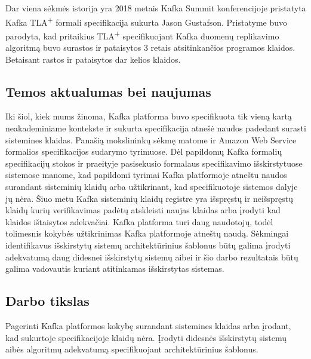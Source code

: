 \documentclass{VUMIFPSmagistrinis}
\begin{document}
		Dar viena sėkmės istorija yra 2018 metais Kafka Summit konferencijoje pristatyta Kafka TLA\textsuperscript{+} formali specifikacija sukurta Jason Gustafson\cite{kfkTla}.
		Pristatyme buvo parodyta, kad pritaikius TLA\textsuperscript{+} specifikuojant Kafka duomenų replikavimo algoritmą buvo surastos ir pataisytos 3 retais atsitinkančios programos klaidos.
		Betaisant rastos ir pataisytos dar kelios klaidos.

	\subsection{Temos aktualumas bei naujumas}
		Iki šiol, kiek mums žinoma, Kafka platforma buvo specifikuota tik vieną kartą\cite{kfkTla} neakademiniame kontekste ir sukurta specifikacija atnešė naudos padedant surasti sistemines klaidas.
		Panašią mokslininkų sėkmę matome ir Amazon Web Service formalios specifikacijos sudarymo tyrimuose\cite{newcombe2014use}.
		Dėl papildomų Kafka formalių specifikacijų stokos ir praeityje pasisekusio formalaus specifikavimo išskirstytuose sistemose manome, kad papildomi tyrimai Kafka platformoje atneštu naudos surandant sisteminių klaidų arba užtikrinant, kad specifikuotoje sistemos dalyje jų nėra.
		Šiuo metu Kafka sisteminių klaidų registre\cite{kfkissue} yra išspręstų ir neišspręstų  klaidų kurių verifikavimas padėtų atskleisti naujas klaidas arba įrodyti kad klaidos ištaisytos adekvačiai.
		Kafka platforma turi daug naudotojų\cite{kfk}, todėl tolimesnis kokybės užtikrinimas Kafka platformoje atneštų naudą.
		Sėkmingai identifikavus išskirstytų sistemų architektūrinius šablonus\cite{hohpe2004enterprise} būtų galima įrodyti adekvatumą daug didesnei išskirstytų sistemų aibei ir šio darbo rezultatais būtų galima vadovautis kuriant atitinkamas išskirstytas sistemas. 
	
	\subsection{Darbo tikslas}
		Pagerinti Kafka platformos kokybę surandant sistemines klaidas arba įrodant, kad sukurtoje specifikacijoje klaidų nėra.
		Įrodyti didesnės išskirstytų sistemų aibės algoritmų adekvatumą specifikuojant architektūrinius šablonus.
	
\end{document}
